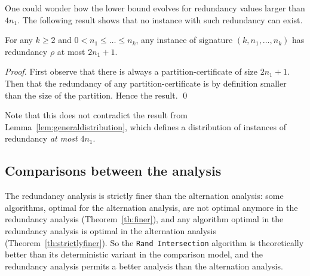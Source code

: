 One could wonder how the lower bound evolves for redundancy values
larger than $4n_1$.
%
The following result shows that no instance with such redundancy can
exist.
%
\begin{lemma}\label{lem:rhoupperbound}
For any $k\geq 2$ and
$0{<}n_1{\leq}\ldots{\leq}n_k$, any instance of signature
$(k,n_1,\ldots,n_k)$ has redundancy $\rho$ at most $2n_1{+}1$.
\end{lemma}
\begin{proof}
First observe that there is always a partition-certificate of size
$2n_1+1$. Then that the redundancy of any partition-certificate is by
definition smaller than the size of the partition. Hence the result.
\qed\end{proof} 
%
Note that this does not contradict the result from
Lemma~\ref{lem:generaldistribution}, which defines a distribution of
instances of redundancy {\em at most} $4n_1$.

\subsection{Comparisons between the analysis}\label{sec:comparison}

The redundancy analysis is strictly finer than the alternation analysis:
%
some algorithms, optimal for the alternation analysis, are not optimal
anymore in the redundancy analysis (Theorem~\ref{th:finer}),
%
and any algorithm optimal in the redundancy analysis is optimal in the
alternation analysis (Theorem~\ref{th:strictlyfiner}).
%
So the {\tt Rand Intersection} algorithm is theoretically better than
its deterministic variant in the comparison model, and the redundancy
analysis permits a better analysis than the alternation analysis.

